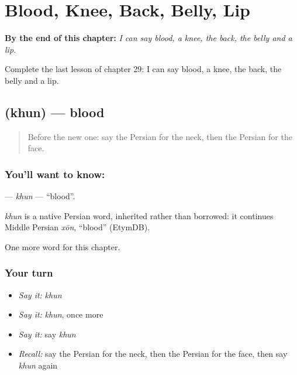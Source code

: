
\chapter{Blood, Knee, Back, Belly, Lip}
\label{ch:fa-blood-knee-back-belly-lip}

\begin{chapteropening}
\textbf{By the end of this chapter:} \emph{I can say blood, a knee, the back, the belly and a lip.}

Complete the last lesson of chapter 29: I can say blood, a knee, the back, the belly and a lip.
\end{chapteropening}

\section[\texorpdfstring{\fa{خون} (khun)}{خون (khun)}]{ (khun) — blood}

\label{lesson:FA-C29-khun}



\begin{quote}
Before the new one: say the Persian for the neck, then the Persian for the face.
\end{quote}

\subsection*{You'll want to know: }
\textbf{} — \emph{khun} — \textquotedblleft{}blood\textquotedblright{}.

\begin{cousinweb}
\emph{khun} is a native Persian word, inherited rather than borrowed: it continues Middle Persian \emph{xōn}, \textquotedblleft{}blood\textquotedblright{} (EtymDB).
\end{cousinweb}

\begin{grammarlens}[title={What you've built}]
One more word for this chapter.
\end{grammarlens}

\subsection*{Your turn}
\begin{itemize}
\raggedright
  \item \emph{Say it:} \emph{khun}
  \item \emph{Say it:} \emph{khun}, once more
  \item \emph{Say it:} say \emph{khun}
  \item \emph{Recall:} say the Persian for the neck, then the Persian for the face, then say \emph{khun} again
\end{itemize}

